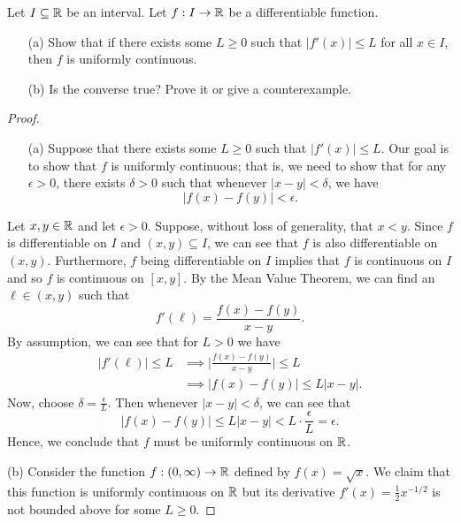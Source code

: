 \documentclass[a4paper]{article}
\begin{document}
\begin{problem}
    Let \( I \subseteq  \mathbb{R}   \) be an interval. Let \( f: I \to \mathbb{R}  \) be a differentiable function. 
    \begin{enumerate}
        \item[(a)] Show that if there exists some \( L \geq 0  \) such that \( | f'(x) | \leq L  \) for all \( x \in I  \), then \( f  \) is uniformly continuous.
        \item[(b)] Is the converse true? Prove it or give a counterexample. 
    \end{enumerate}
\end{problem}

\begin{proof}
\begin{enumerate}
    \item[(a)] Suppose that there exists some \( L \geq 0  \) such that \( | f'(x) |  \leq L  \). Our goal is to show that \( f  \) is uniformly continuous; that is, we need to show that for any \( \epsilon > 0  \), there exists \( \delta > 0  \) such that whenever \( | x - y  |  < \delta  \), we have
        \[  | f(x) - f(y) |  < \epsilon. \]
\end{enumerate}
Let \( x,y \in \mathbb{R}  \) and let \( \epsilon > 0  \). Suppose, without loss of generality, that \( x < y  \). Since \( f \) is differentiable on \( I  \) and \( (x,y) \subseteq  I  \), we can see that \( f  \) is also differentiable on \( (x,y) \). Furthermore, \( f  \) being differentiable on \( I \) implies that \( f  \) is continuous on \( I  \) and so \( f  \) is continuous on \( [x,y] \). By the Mean Value Theorem, we can find an \( \ell \in (x,y) \) such that   
\[  f'(\ell) = \frac{ f(x) - f(y) }{ x - y  }. \]
By assumption, we can see that for \( L > 0 \) we have 
\begin{align*}
| f'(\ell) | \leq L &\implies \Big|  \frac{ f(x) - f(y) }{ x - y  }  \Big| \leq L \\   
                    &\implies | f(x) - f(y) | \leq L | x - y |.
\end{align*} 
Now, choose \( \delta = \frac{ \epsilon  }{  L  }  \). Then whenever \( | x - y  |  < \delta \), we can see that 
\[  | f(x) - f(y)  |  \leq L | x - y  |  < L \cdot \frac{ \epsilon  }{  L  }   =  \epsilon. \]
Hence, we conclude that \( f  \) must be uniformly continuous on \( \mathbb{R}  \).
    \item[(b)] Consider the function \( f: (0,\infty ) \to \mathbb{R}  \) defined by \( f(x) = \sqrt{ x }  \). We claim that this function is uniformly continuous on \( \mathbb{R}  \) but its derivative \( f'(x) = \frac{ 1 }{ 2 }  x^{-1/2} \) is not bounded above for some \( L \geq 0  \). 


\end{proof}
\end{document}
